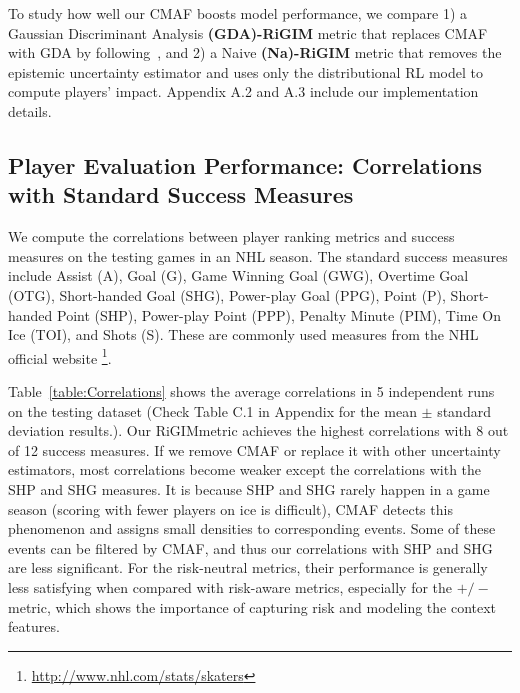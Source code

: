 \documentclass{article}
\newcommand{\sys}{RiGIM}
\newcommand{\system}{\sys\;}
\begin{document}
To study how well our CMAF boosts model performance, we compare 1) a Gaussian Discriminant Analysis {\bf (GDA)-\system} metric that replaces CMAF with GDA by following~\cite{Mukhoti2021Uncertainty}, and 2) a Naive {\bf (Na)-\system} metric that removes the epistemic uncertainty estimator and uses only the distributional RL model to compute players' impact. Appendix A.2 and A.3 include our implementation details.

\subsection{Player Evaluation Performance: Correlations with Standard Success Measures}

We compute the correlations between player ranking metrics and success measures on the testing games in an NHL season. The standard success measures include Assist (A), Goal (G), Game Winning Goal (GWG), Overtime Goal
(OTG), Short-handed Goal (SHG), Power-play Goal (PPG),
Point (P), Short-handed Point (SHP), Power-play Point
(PPP),  Penalty Minute (PIM), Time On Ice (TOI), and Shots (S). These
are commonly used measures from the NHL official website \footnote{\url{http://www.nhl.com/stats/skaters}}.

Table~\ref{table:Correlations} shows the average correlations in 5 independent runs on the testing dataset (Check Table C.1 in Appendix for the mean $\pm$ standard deviation results.). Our \system metric achieves the highest correlations with 8 out of 12 success measures. If we remove CMAF or replace it with other uncertainty estimators, most correlations become weaker except the correlations with the SHP and SHG measures. It is because SHP and SHG rarely happen in a game season (scoring with fewer players on ice is difficult), CMAF detects this phenomenon and assigns small densities to corresponding events. Some of these events can be filtered by CMAF, and thus our correlations with SHP and SHG are less significant. For the risk-neutral metrics, their performance is generally less satisfying when compared with risk-aware metrics, especially for the $+/-$ metric, which shows the importance of capturing risk and modeling the context features.
\end{document}
